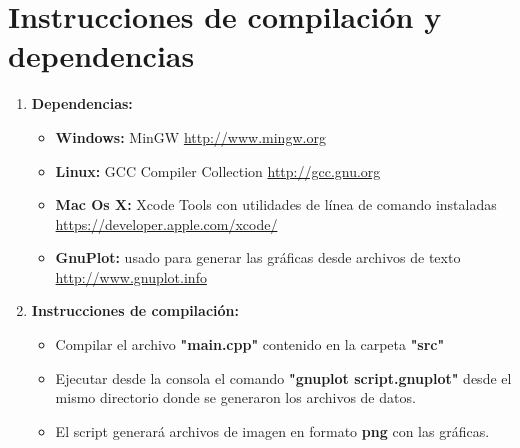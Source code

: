 \section{Instrucciones de compilación y dependencias}
\begin{enumerate}
	\item \textbf{Dependencias:}
		\begin{itemize}
			\item \textbf{Windows:}  MinGW  \url{http://www.mingw.org}
			\item \textbf{Linux:} GCC Compiler Collection  \url{http://gcc.gnu.org}
			\item \textbf{Mac Os X:} Xcode Tools con utilidades de línea de comando instaladas  							\url{https://developer.apple.com/xcode/}
			\item \textbf{GnuPlot:}  usado para generar las gr\'aficas desde archivos de texto 								\url{http://www.gnuplot.info}
		\end{itemize}
	\item \textbf{Instrucciones de compilación:}
			\begin{itemize}
			\item Compilar el archivo \textbf{"main.cpp"} contenido en la carpeta \textbf{"src"}
			\item Ejecutar desde la consola el comando \textbf{"gnuplot script.gnuplot"} desde el 					mismo directorio donde se generaron los archivos de datos.
			\item El script generará archivos de imagen en formato \textbf{png} con las gr\'aficas.
			\end{itemize}
\end{enumerate}

